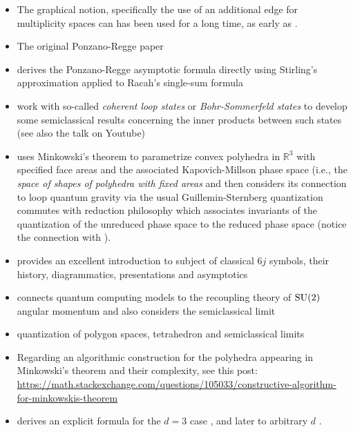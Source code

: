 \documentclass[notitlepage, 10pt]{article}
\begin{document}
\begin{itemize}
    \item The graphical notion, specifically the use of an additional edge for multiplicity spaces can has been used for a long time, as early as \cite{agrawala1968graphical,moussouris1984quantum}.
    \item The original Ponzano-Regge paper \cite{ponzano1968semiclassical}
    \item \citeauthor{gurau2008ponzano} derives the Ponzano-Regge asymptotic formula directly using Stirling's approximation applied to Racah's single-sum formula \cite{gurau2008ponzano}
    \item \citeauthor{bartlett2023coherent} work with so-called \textit{coherent loop states} or \textit{Bohr-Sommerfeld states} to develop some semiclassical results concerning the inner products between such states (see also the talk on Youtube) \cite{bartlett2023coherent}
    \item \citeauthor{bianchi2011polyhedra} uses Minkowski's theorem to parametrize convex polyhedra in $\mathbb R^{3}$ with specified face areas and the associated Kapovich-Millson phase space (i.e., the \textit{space of shapes of polyhedra with fixed areas} and then considers its connection to loop quantum gravity via the usual Guillemin-Sternberg quantization commutes with reduction philosophy which associates invariants of the quantization of the unreduced phase space to the reduced phase space \cite{bianchi2011polyhedra} (notice the connection with \cite{haggard2016encoding}).
    \item \citeauthor{aquilanti2012semiclassical} provides an excellent introduction to subject of classical $6j$ symbols, their history, diagrammatics, presentations and asymptotics \cite{aquilanti2012semiclassical}
    \item \citeauthor{marzuoli2005computing} connects quantum computing models to the recoupling theory of $\operatorname{SU}(2)$ angular momentum and also considers the semiclassical limit \cite{marzuoli2005computing}
    \item \citeauthor{charles2010quantization} quantization of polygon spaces, tetrahedron and semiclassical limits \cite{charles2010quantization}
    \item Regarding an algorithmic construction for the polyhedra appearing in Minkowski's theorem and their complexity, see this post: \url{https://math.stackexchange.com/questions/105033/constructive-algorithm-for-minkowskis-theorem}
    \item \citeauthor{artamonov2023classical} derives an explicit formula for the $d=3$ case \cite{artamonov2023classical}, and later to arbitrary $d$ \cite{artamonov2024calculation}.

\end{itemize}
\end{document}
